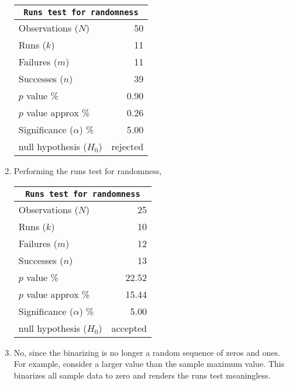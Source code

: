 \begin{enumerate}
	\begin{table}[H]
		\centering
		\begin{tabular}{@{}lr@{}}
			\toprule
			\multicolumn{2}{c}{\texttt{Runs test for randomness}} \\
			\midrule
			Observations ($N$)         &        50 \\
			Runs ($k$)                 &        11 \\
			Failures ($m$)             &        11 \\
			Successes ($n$)            &        39 \\
			$p$ value \%               &      0.90 \\
			$p$ value approx \%        &      0.26 \\
			Significance ($\alpha$) \% &      5.00 \\
			null hypothesis ($H_0$)    &  rejected \\
			\bottomrule
		\end{tabular}
		
	\end{table}
	\bigskip
	
	\item Performing the runs test for randomness,
	
	\begin{table}[H]
		\centering
		\begin{tabular}{@{}lr@{}}
			\toprule
			\multicolumn{2}{c}{\texttt{Runs test for randomness}} \\
			\midrule
			Observations ($N$)         &        25 \\
			Runs ($k$)                 &        10 \\
			Failures ($m$)             &        12 \\
			Successes ($n$)            &        13 \\
			$p$ value \%               &     22.52 \\
			$p$ value approx \%        &     15.44 \\
			Significance ($\alpha$) \% &      5.00 \\
			null hypothesis ($H_0$)    &  accepted \\
			\bottomrule
		\end{tabular}
		
	\end{table}
	\bigskip
	
	
	\item No, since the binarizing is no longer a random sequence of zeros and ones. For example, consider a larger value than the sample maximum value. This binarizes all sample data to zero and renders the runs test meaningless.
	

\end{enumerate}
